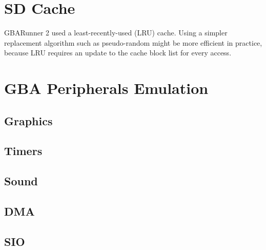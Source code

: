 \documentclass[a4paper,10pt]{report}
\begin{document}
\chapter{SD Cache}
	GBARunner 2 used a least-recently-used (LRU) cache. Using a simpler replacement algorithm such as pseudo-random might be more efficient in practice, because LRU requires an update to the cache block list for every access.
\chapter{GBA Peripherals Emulation}
	\section{Graphics}
	\section{Timers}
	\section{Sound}
	\section{DMA}
	\section{SIO}
\end{document}

